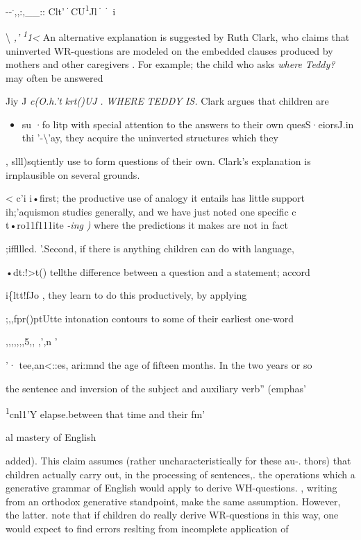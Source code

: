 {}-{}-\textsuperscript{.},,:,\_\_:: \textsuperscript{{\textquotedbl}}C\textsuperscript{{\textquotedbl}}lt'\textsuperscript{·}CU\textsuperscript{1}Jl\textsuperscript{·}\textsuperscript{·} i

{\textbackslash} \textit{,'} \textit{\textsuperscript{1}}\textit{1{\textless}} An alternative explanation is suggested by Ruth Clark, who
claims that uninverted WR-questions are modeled on the embedded
clauses produced by mothers and other caregivers \citep{Clark1977}.
For example; the child who asks \textit{where} \textit{Teddy?} may often be answered

Jiy J \textit{c(O.}\textit{h.'t} \textit{krt()UJ} \textit{.} \textit{WHERE} \textit{TEDDY} \textit{IS.} Clark argues that children are

\begin{itemize}
\item su ·fo litp with special attention to the answers to their own ques\-S·eiorsJ.in thi '-{\textbackslash}'ay, they acquire the uninverted structures which they
\end{itemize}

, slll)sqtiently use to form questions of their own. Clark's explanation is irnplausible on several grounds.

{\textless} c'i i•first; the productive use of analogy it entails has little support ih;'aquismon studies generally, and we have just noted one specific c t•ro11f111ite \textit{{}-i}\textit{n}\textit{g{\textquotedbl}} \textit{)} where the predictions it makes are not in fact

;iffllled. '.Second, if there is anything children can do with language,

•dt:!{\textgreater}t() tellthe difference between a question and a statement; accord\-

i\{ltt!fJo \citet{Halliday1975}, they learn to do this productively, by applying

;,,fpr()ptUtte intonation contours to some of their earliest one-word

,,,,,,,5,, ,',n '

'· tee,an{\textless}::es, ari:mnd the age of fifteen months. In the two years or so

the sentence and inversion of the subject and auxiliary verb'' (emphas'

\textsuperscript{1}cnl1'Y elapse.between that time and their fm'

al mastery of English

added). This claim assumes (rather uncharacteristically for these au-. thors) that children actually carry out, in the processing of sentences,. the operations which a generative grammar of English would apply to derive WH-questions. \citet{ErreichEtAl1980}, writing from an orthodox generative standpoint, make the same assumption. However, the latter. note that if children do really derive WR-questions in this way, one would expect to find errors reslting from incomplete application of

